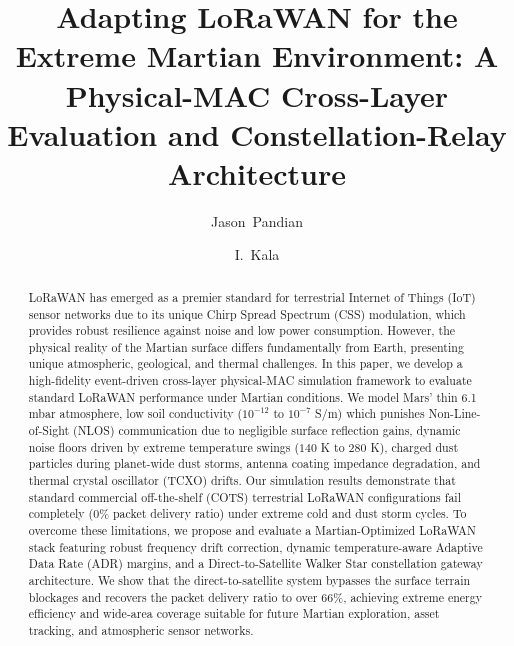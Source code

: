 \documentclass{ijuc}
\begin{document}
\title{Adapting LoRaWAN for the Extreme Martian Environment: A Physical-MAC Cross-Layer Evaluation and Constellation-Relay Architecture}

\author{Jason~Pandian
\and I.~Kala}


\def\received{Received 28 May 2026; In final form 28 May 2026}

\maketitle

\begin{abstract}
LoRaWAN has emerged as a premier standard for terrestrial Internet of Things (IoT) sensor networks due to its unique Chirp Spread Spectrum (CSS) modulation, which provides robust resilience against noise and low power consumption. However, the physical reality of the Martian surface differs fundamentally from Earth, presenting unique atmospheric, geological, and thermal challenges. In this paper, we develop a high-fidelity event-driven cross-layer physical-MAC simulation framework to evaluate standard LoRaWAN performance under Martian conditions. We model Mars' thin 6.1 mbar atmosphere, low soil conductivity ($10^{-12}$ to $10^{-7}$ S/m) which punishes Non-Line-of-Sight (NLOS) communication due to negligible surface reflection gains, dynamic noise floors driven by extreme temperature swings ($140$ K to $280$ K), charged dust particles during planet-wide dust storms, antenna coating impedance degradation, and thermal crystal oscillator (TCXO) drifts. Our simulation results demonstrate that standard commercial off-the-shelf (COTS) terrestrial LoRaWAN configurations fail completely (0\% packet delivery ratio) under extreme cold and dust storm cycles. To overcome these limitations, we propose and evaluate a Martian-Optimized LoRaWAN stack featuring robust frequency drift correction, dynamic temperature-aware Adaptive Data Rate (ADR) margins, and a Direct-to-Satellite Walker Star constellation gateway architecture. We show that the direct-to-satellite system bypasses the surface terrain blockages and recovers the packet delivery ratio to over 66\%, achieving extreme energy efficiency and wide-area coverage suitable for future Martian exploration, asset tracking, and atmospheric sensor networks.
\end{abstract}
\end{document}
